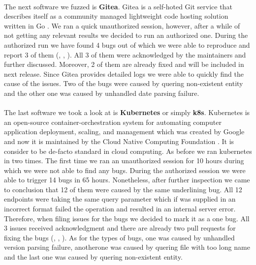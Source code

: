 \paragraph{}
The next software we fuzzed is \textbf{Gitea}. Gitea is a self-hoted Git service that describes itself as a community managed lightweight code hosting solution written in Go \cite{gitea2020web}. We ran a quick unauthorized session, however, after a while of not getting any relevant results we decided to run an authorized one. During the authorized run we have found 4 bugs out of which we were able to reproduce and report 3 of them (\cite{giteaissue15346github}, \cite{giteaissue15357github}, \cite{giteaissue15356github}). All 3 of them were acknowledged by the maintainers and further discussed. Moreover, 2 of them are already fixed and will be included in next release. Since Gitea provides detailed logs we were able to quickly find the cause of the issues. Two of the bugs were caused by quering non-existent entity and the other one was caused by unhandled date parsing failure.

\paragraph{}
The last software we took a look at is \textbf{Kubernetes} or simply \textbf{k8s}. Kubernetes is an open-source container-orchestration system for automating computer application deployment, scaling, and management which was created by Google and now it is maintained by the Cloud Native Computing Foundation \cite{k8s2021web}. It is consider to be de-facto standard in cloud computing. As before we ran kubernetes in two times. The first time we ran an unauthorized session for 10 hours during which we were not able to find any bugs. During the authorized session we were able to trigger 14 bugs in 65 hours. Nonetheless, after further inspection we came to conclusion that 12 of them were caused by the same underlining bug. All 12 endpoints were taking the same query parameter which if was supplied in an incorrect format failed the operation and resulted in an internal server error. Therefore, when filing issues for the bugs we decided to mark it as a one bug. All 3 issues received acknowledgment and there are already two pull requests for fixing the bugs (\cite{k8sissue101355github}, \cite{k8sissue101350github}, \cite{k8sissue101348github}). As for the types of bugs, one was caused by unhandled version parsing failure, anotherone was caused by quering file with too long name and the last one was caused by quering non-existent entity.

